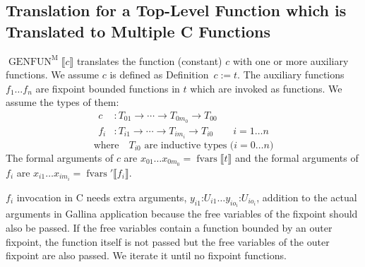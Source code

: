 \documentclass[a4paper,fleqn]{article}
\def\gallina{\textrm{Gallina}}
\newcommand{\kwDefinition}{\mbox{\color{myviolet}\ttfamily Definition}}
\newcommand{\BRA}[1]{\llbracket #1 \rrbracket}
\DeclareMathOperator{\genfunop}{GENFUN}
\newcommand{\genfunm}[1]{\genfunop^\mathrm{M}\BRA{#1}}
\DeclareMathOperator{\fvarsop}{fvars}
\newcommand{\fvars}[1]{\fvarsop\BRA{#1}}
\newcommand{\fvarsd}[1]{\fvarsop'\BRA{#1}}
\begin{document}
\subsection{Translation for a Top-Level Function which is Translated to Multiple C Functions}\label{sec:genfunm}
$\genfunm{c}$ translates the function (constant) $c$ with one or more auxiliary functions.
We assume $c$ is defined as \kwDefinition~$c := t.$
The auxiliary functions $f_1 \ldots f_n$ are fixpoint bounded functions in $t$ which are invoked as functions.
We assume the types of them:
\begin{align*}
  c &: T_{01} \rightarrow \dotsb \rightarrow T_{0m_0} \rightarrow T_{00} \\
  f_i &: T_{i1} \rightarrow \dotsb \rightarrow T_{im_i} \rightarrow T_{i0} && i = 1\ldots n
\end{align*}
\[ \text{where} \quad \text{$T_{i0}$ are inductive types ($i=0\ldots n$)} \]
The formal arguments of $c$ are $x_{01}\ldots x_{0m_0} = \fvars{t}$ and
the formal arguments of $f_i$ are $x_{i1}\ldots x_{im_i} = \fvarsd{f_i}$.

$f_i$ invocation in C needs extra arguments, $y_{i1}\mathord{:}U_{i1} \ldots y_{io_i}\mathord{:}U_{io_i}$, addition to the actual arguments in \gallina{} application because the free variables of the fixpoint should also be passed.
If the free variables contain a function bounded by an outer fixpoint, the function itself is not passed but the free variables of the outer fixpoint are also passed.
We iterate it until no fixpoint functions.
\end{document}
